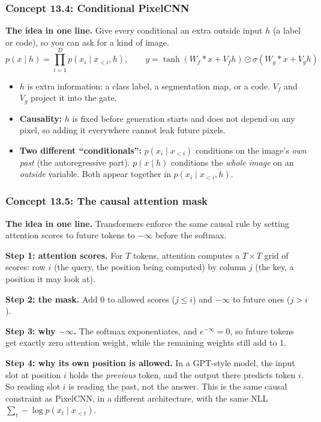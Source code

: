 \documentclass[12pt,a4paper]{article}
\begin{document}
\subsubsection{Concept 13.4: Conditional PixelCNN}\label{c13-4}

\textbf{The idea in one line.} Give every conditional an extra outside input $h$ (a label or code), so you can ask for a kind of image.
\[
p(x\mid h)=\prod_{i=1}^{D}p(x_i\mid x_{<i},h),\qquad
y=\tanh(W_f*x+V_fh)\odot\sigma(W_g*x+V_gh)
\]
\begin{itemize}[nosep]
  \item $h$ is extra information: a class label, a segmentation map, or a code. $V_f$ and $V_g$ project it into the gate.
  \item \textbf{Causality:} $h$ is fixed before generation starts and does not depend on any pixel, so adding it everywhere cannot leak future pixels.
  \item \textbf{Two different ``conditionals'':} $p(x_i\mid x_{<i})$ conditions on the image's \emph{own past} (the autoregressive part). $p(x\mid h)$ conditions the \emph{whole image} on an \emph{outside} variable. Both appear together in $p(x_i\mid x_{<i},h)$.
\end{itemize}

\subsubsection{Concept 13.5: The causal attention mask}\label{c13-5}

\textbf{The idea in one line.} Transformers enforce the same causal rule by setting attention scores to future tokens to $-\infty$ before the softmax.

\textbf{Step 1: attention scores.} For $T$ tokens, attention computes a $T\times T$ grid of scores: row $i$ (the query, the position being computed) by column $j$ (the key, a position it may look at).

\textbf{Step 2: the mask.} Add 0 to allowed scores ($j\le i$) and $-\infty$ to future ones ($j>i$).

\textbf{Step 3: why $-\infty$.} The softmax exponentiates, and $e^{-\infty}=0$, so future tokens get exactly zero attention weight, while the remaining weights still add to 1.

\textbf{Step 4: why its own position is allowed.} In a GPT-style model, the input slot at position $i$ holds the \emph{previous} token, and the output there predicts token $i$. So reading slot $i$ is reading the past, not the answer. This is the same causal constraint as PixelCNN, in a different architecture, with the same NLL $\sum_t-\log p(x_t\mid x_{<t})$.
\end{document}
